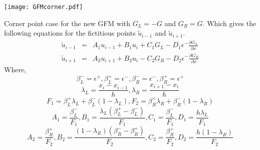 \begin{center}
	\texttt{[image: GFMcorner.pdf]}\\		
\end{center}
		
Corner point case for the new GFM with $G_L=-G$ and $G_R = G$. 
Which gives the following equations for the fictitious points $\tilde{u}_{i-1}$ and $\tilde{u}_{i+1}$. 
	\begin{eqnarray}
		\tilde{u}_{i-1}&=& A_1 u_{i-1}+B_1 u_{i} + C_1 G_L- D_1 \epsilon^- \frac{\partial G_L}{\partial x} \\
		\tilde{u}_{i+1}&=& A_2 u_{i+1}+B_2 u_{i} - C_2 G_R- D_2 \epsilon^- \frac{\partial G_R}{\partial x}
	\end{eqnarray}
	Where,
	$$\beta_L^-=\epsilon^+,\beta_L^+=\epsilon^-,\beta_R^-=\epsilon^-,\beta_R^+=\epsilon^+$$
	$$\lambda_L=\frac{x_i-x_{i-1}}{h},\lambda_R=\frac{x_{i+1}-x_i}{h}$$
	$$F_1 = \beta^+_L \lambda_L+\beta^-_L(1-\lambda_L), F_2 = \beta^+_R \lambda_R+\beta^-_R(1-\lambda_R)$$
	$$	A_1 = \frac{\beta^-_L}{F_1}, B_1  = \frac{\lambda_L(\beta^+_L-\beta^-_L)}{F_1}, C_1 = \frac{\beta^-_L}{F_1},D_1 = \frac{h \lambda_L}{F_1} $$ %
	$$A_2 = \frac{\beta^+_R}{F_2}, B_2  = \frac{(1-\lambda_R)(\beta^-_R-\beta^+_R)}{F_2}, C_2 = \frac{\beta^+_R}{F_2},D_2 = \frac{h(1- \lambda_R)}{F_2}$$
	
